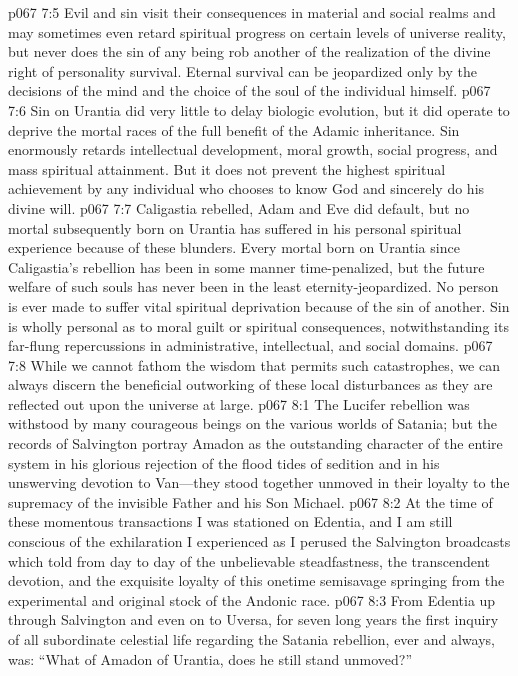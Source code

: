 \vs p067 7:5 Evil and sin visit their consequences in material and social realms and may sometimes even retard spiritual progress on certain levels of universe reality, but never does the sin of any being rob another of the realization of the divine right of personality survival. Eternal survival can be jeopardized only by the decisions of the mind and the choice of the soul of the individual himself.
\vs p067 7:6 Sin on Urantia did very little to delay biologic evolution, but it did operate to deprive the mortal races of the full benefit of the Adamic inheritance. Sin enormously retards intellectual development, moral growth, social progress, and mass spiritual attainment. But it does not prevent the highest spiritual achievement by any individual who chooses to know God and sincerely do his divine will.
\vs p067 7:7 Caligastia rebelled, Adam and Eve did default, but no mortal subsequently born on Urantia has suffered in his personal spiritual experience because of these blunders. Every mortal born on Urantia since Caligastia’s rebellion has been in some manner time\hyp{}penalized, but the future welfare of such souls has never been in the least eternity\hyp{}jeopardized. No person is ever made to suffer vital spiritual deprivation because of the sin of another. Sin is wholly personal as to moral guilt or spiritual consequences, notwithstanding its far\hyp{}flung repercussions in administrative, intellectual, and social domains.
\pc \vs p067 7:8 While we cannot fathom the wisdom that permits such catastrophes, we can always discern the beneficial outworking of these local disturbances as they are reflected out upon the universe at large.
\vs p067 8:1 The Lucifer rebellion was withstood by many courageous beings on the various worlds of Satania; but the records of Salvington portray Amadon as the outstanding character of the entire system in his glorious rejection of the flood tides of sedition and in his unswerving devotion to Van---they stood together unmoved in their loyalty to the supremacy of the invisible Father and his Son Michael.
\vs p067 8:2 At the time of these momentous transactions I was stationed on Edentia, and I am still conscious of the exhilaration I experienced as I perused the Salvington broadcasts which told from day to day of the unbelievable steadfastness, the transcendent devotion, and the exquisite loyalty of this onetime semisavage springing from the experimental and original stock of the Andonic race.
\vs p067 8:3 From Edentia up through Salvington and even on to Uversa, for seven long years the first inquiry of all subordinate celestial life regarding the Satania rebellion, ever and always, was: “What of Amadon of Urantia, does he still stand unmoved?”
